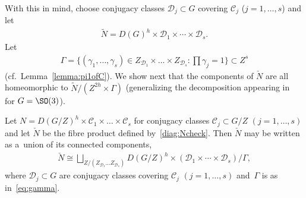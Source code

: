 With this in mind, choose conjugacy classes $\mathcal{D}_j \subset G$ covering $\mathcal{C}_j$ ($j=1,\ldots, s$) and let
\begin{gather*}
\widetilde{N}= D(G)^h\times\mathcal{D}_1 \times \cdots \times \mathcal{D}_s.
\end{gather*}
Let
\begin{gather}
\label{eq:gamma}
\Gamma = \Big\{(\gamma_1, \ldots, \gamma_{s}) \in Z_{\mathcal{D}_1} \times \dots \times Z_{\mathcal{D}_s} \colon \prod
\gamma_j =1 \Big\} \subset Z^s
\end{gather}
(cf.~Lemma~\ref{lemma:pi1ofC}).
We show next that the components of $\check{N}$ are all homeomorphic to $\widetilde{N}/(Z^{2h}\times \Gamma)$
(generalizing the decomposition appearing in~\cite[Lemma~2.3]{KM} for $G=\SO(3)$).

\begin{Proposition}
\label{prop:comps}
Let $N=D(G/Z)^h\times \mathcal{C}_1 \times \dots \times \mathcal{C}_s $ for conjugacy classes $\mathcal{C}_j \subset
G/Z$ $(j=1,\ldots,s)$ and let $\check{N}$ be the fibre product defined by~\eqref{diag:Ncheck}.
Then $\check{N}$ may be written as a~union of its connected components,
\begin{gather*}
\check{N} \cong \bigsqcup_{Z/(Z_{\mathcal{D}_1} \dots Z_{\mathcal{D}_s})}D(G/Z)^h\times (\mathcal{D}_1 \times \cdots
\times \mathcal{D}_s)/{\Gamma},
\end{gather*}
where $\mathcal{D}_j \subset G$ are conjugacy classes covering $\mathcal{C}_j$ $(j=1,\ldots,s)$ and~$\Gamma$ is as
in~\eqref{eq:gamma}.
\end{Proposition}
